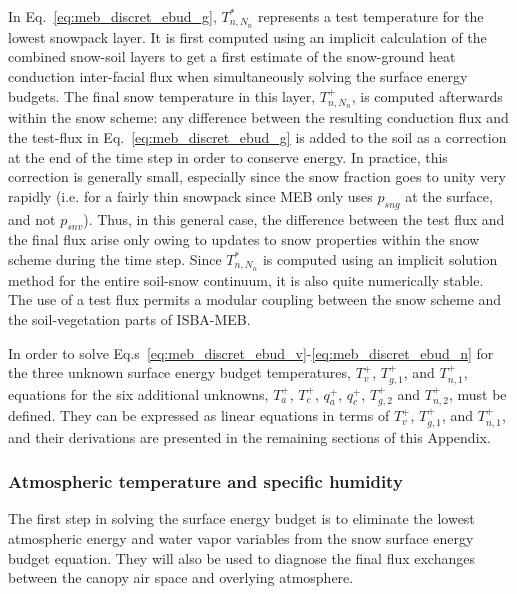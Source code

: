 {In Eq.~\ref{eq:meb_discret_ebud_g}, $T_{n,N_n}^\ast$ represents a test 
temperature for the lowest snowpack layer. It is first computed using
an implicit calculation of the combined snow-soil layers to get a
first estimate of the snow-ground heat conduction inter-facial flux
when simultaneously solving the surface energy budgets.
The final snow temperature in this layer, $T_{n,N_n}^+$, is computed afterwards
within the snow scheme: any difference between the resulting
conduction flux and the test-flux in Eq.~\ref{eq:meb_discret_ebud_g} is added to
the soil as a correction at the end of the time step
in order to conserve energy. In practice,
this correction is generally small, especially since the snow fraction
goes to unity very rapidly (i.e. for a fairly thin 
snowpack since MEB only uses $p_{sng}$ at the surface, and not $p_{snv}$). 
Thus, in this general case, the difference
between the test flux and the final flux arise only owing to updates
to snow properties within the snow scheme during the time step.
Since $T_{n,N_n}^\ast$ is computed using an implicit solution method
for the entire soil-snow continuum, it is also quite numerically
stable. The use of a test flux permits a modular coupling between the
snow scheme and the soil-vegetation parts of ISBA-MEB.

In order to solve Eq.s~\ref{eq:meb_discret_ebud_v}-\ref{eq:meb_discret_ebud_n} 
for the three unknown surface energy budget
temperatures, $T_v^+$, $T_{g,1}^+$, and $T_{n,1}^+$, equations for the
six additional unknowns, 
$T_{a}^+$, $T_{c}^+$, $q_a^+$, $q_c^+$, $T_{g,2}^+$ and $T_{n,2}^+$, must be
defined. 
They can be expressed as linear equations 
in terms of $T_v^+$, $T_{g,1}^+$, and $T_{n,1}^+$, and
their derivations are presented in the remaining sections of this
Appendix.


\subsubsection{Atmospheric temperature and specific humidity}

The first step in solving the surface energy budget is to eliminate the
lowest atmospheric energy and water vapor variables from the 
snow surface energy budget equation. They will also be used
to diagnose the final flux exchanges between the canopy air space and
overlying atmosphere.


}
